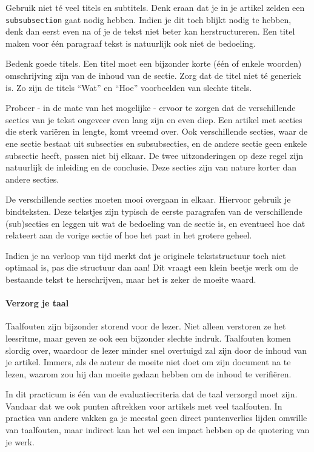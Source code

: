 \documentclass[a4paper]{article}
\begin{document}
Gebruik niet t\'e veel titels en subtitels.
Denk eraan dat je in je artikel zelden een \texttt{\\subsubsection} gaat nodig hebben.
Indien je dit toch blijkt nodig te hebben, denk dan eerst even na of je de tekst niet beter kan herstructureren.
Een titel maken voor één paragraaf tekst is natuurlijk ook niet de bedoeling.

Bedenk goede titels.
Een titel moet een bijzonder korte (\'e\'en of enkele woorden) omschrijving zijn van de inhoud van de sectie.
Zorg dat de titel niet t\'e generiek is.
Zo zijn de titels ``Wat'' en ``Hoe'' voorbeelden van slechte titels.

Probeer - in de mate van het mogelijke - ervoor te zorgen dat de verschillende secties van je tekst ongeveer even lang zijn en even diep.
Een artikel met secties die sterk variëren in lengte, komt vreemd over.
Ook verschillende secties, waar de ene sectie bestaat uit subsecties en subsubsecties, en de andere sectie geen enkele subsectie heeft, passen niet bij elkaar.
De twee uitzonderingen op deze regel zijn natuurlijk de inleiding en de conclusie.
Deze secties zijn van nature korter dan andere secties.

De verschillende secties moeten mooi overgaan in elkaar.
Hiervoor gebruik je bindteksten.
Deze tekstjes zijn typisch de eerste paragrafen van de verschillende (sub)secties en leggen uit wat de bedoeling van de sectie is, en eventueel hoe dat relateert aan de vorige sectie of hoe het past in het grotere geheel.

Indien je na verloop van tijd merkt dat je originele tekststructuur toch niet optimaal is, pas die structuur dan aan!
Dit vraagt een klein beetje werk om de bestaande tekst te herschrijven, maar het is zeker de moeite waard.


\paragraph{Verzorg je taal}

Taalfouten zijn bijzonder storend voor de lezer.
Niet alleen verstoren ze het leesritme, maar geven ze ook een bijzonder slechte indruk.
Taalfouten komen slordig over, waardoor de lezer minder snel overtuigd zal zijn door de inhoud van je artikel.
Immers, als de auteur de moeite niet doet om zijn document na te lezen, waarom zou hij dan moeite gedaan hebben om de inhoud te verifi\"eren.

In dit practicum is \'e\'en van de evaluatiecriteria dat de taal verzorgd moet zijn.
Vandaar dat we ook punten aftrekken voor artikels met veel taalfouten.
In practica van andere vakken ga je meestal geen direct puntenverlies lijden omwille van taalfouten, maar indirect kan het wel een impact hebben op de quotering van je werk.
\end{document}
